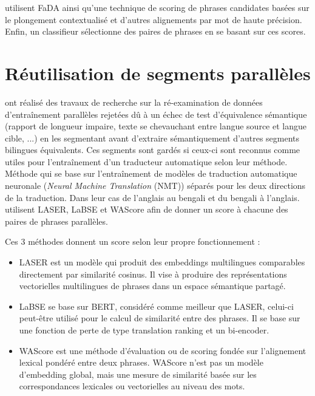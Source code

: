 \citet{steingrimsson_2021} utilisent FaDA ainsi qu'une technique de scoring de phrases candidates basées sur
le plongement contextualisé et d'autres alignements par mot de haute précision. Enfin, un classifieur
sélectionne des paires de phrases en se basant sur ces scores.

\section{Réutilisation de segments parallèles}

\citet{steingrimsson_2023} ont réalisé des travaux de recherche sur la ré-examination de données
d'entraînement parallèles rejetées dû à un échec de test d'équivalence sémantique (rapport de longueur impaire,
texte se chevauchant entre langue source et langue cible, ...) en les segmentant avant d'extraire sémantiquement d'autres segments
bilingues équivalents. Ces segments sont gardés si ceux-ci sont reconnus comme utiles pour l'entraînement
d'un traducteur automatique selon leur méthode. Méthode qui se base sur l'entraînement de modèles de traduction
automatique neuronale (\textit{Neural Machine Translation} (NMT)) séparés pour les deux directions de la traduction.
Dans leur cas de l'anglais au bengali et du bengali à l'anglais. \citet{steingrimsson_2023} utilisent LASER,
LaBSE et WAScore afin de donner un score à chacune des paires de phrases parallèles.

Ces 3 méthodes donnent un score selon leur propre fonctionnement :
\begin{itemize}
    \item LASER est un modèle qui produit des embeddings multilingues comparables directement par
    similarité cosinus. Il vise à produire des représentations vectorielles multilingues de
    phrases dans un espace sémantique partagé.
    \item LaBSE se base sur BERT, considéré comme meilleur que LASER, celui-ci peut-être utilisé pour le
    calcul de similarité entre des phrases. Il se base sur une fonction de perte de type translation ranking et un
    bi-encoder.
    \item WAScore est une méthode d’évaluation ou de scoring fondée sur l’alignement lexical pondéré entre deux phrases.
    WAScore n'est pas un modèle d'embedding global, mais une mesure de
    similarité basée sur les correspondances lexicales ou vectorielles au niveau
    des mots.
\end{itemize}

